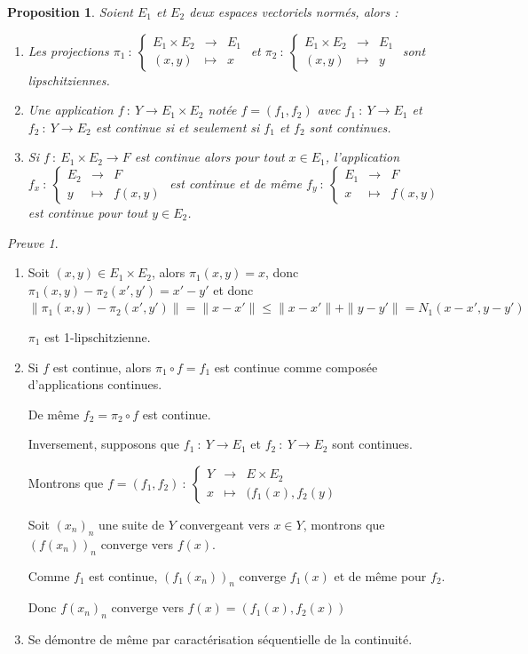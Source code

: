 \documentclass[]{article}
\newtheorem{myproposition}{Proposition}
\theoremstyle{remark}
\newtheorem{myproof}{Preuve}
\theoremstyle{definition}
\newcommand{\func}[5]{
#1 ~ : ~ \left\{ \begin{array}{lcl}
	#2 & \longrightarrow & #3 \\
	#4 & \longmapsto & #5
\end{array}
\right.
}
\newcommand{\funcshort}[3]{
#1 ~ : ~ #2 \longrightarrow #3
}
\begin{document}
\begin{myproposition}
	Soient $E_1$ et $E_2$ deux espaces vectoriels normés, alors :
	
	\begin{enumerate}
		\item Les projections $\func{\pi_1}{E_1 \times E_2}{E_1}{(x,y)}{x}$
		et $\func{\pi_2}{E_1 \times E_2}{E_1}{(x,y)}{y}$
		sont lipschitziennes.
		
		\item Une application $\funcshort{f}{Y}{E_1 \times E_2}$ notée $f=(f_1, f_2)$ avec $\funcshort{f_1}{Y}{E_1}$ et $\funcshort{f_2}{Y}{E_2}$ est continue si et seulement si $f_1$ et $f_2$ sont continues.
		
		\item Si $\funcshort{f}{E_1 \times E_2}{F}$ est continue alors pour tout $x \in E_1$, l'application $\func{f_x}{E_2}{F}{y}{f(x, y)}$ est continue et de même $\func{f_y}{E_1}{F}{x}{f(x, y)}$ est continue pour tout $y \in E_2$.
	\end{enumerate}
\end{myproposition}

\begin{myproof}
	\begin{enumerate}
		\item Soit $(x, y) \in E_1 \times E_2$, alors $\pi_1(x, y) = x$, donc $\pi_1(x,y) - \pi_2(x',y')=x'-y'$ et donc $\|\pi_1(x,y) - \pi_2(x',y')\| = \|x-x'\| \leqslant \|x-x'\| + \|y-y'\| = N_1(x-x', y-y')$
		
		$\pi_1$ est 1-lipschitzienne.
		
		\item Si $f$ est continue, alors $\pi_1 \circ f=f_1$ est continue comme composée d'applications continues.
		
		De même $f_2=\pi_2 \circ f$ est continue.
		
		Inversement, supposons que $\funcshort{f_1}{Y}{E_1}$ et $\funcshort{f_2}{Y}{E_2}$ sont continues.
		
		Montrons que $\func{f=(f_1, f_2)}{Y}{E \times E_2}{x}{(f_1(x), f_2(y)}$
		
		Soit $(x_n)_n$ une suite de $Y$ convergeant vers $x \in Y$, montrons que $(f(x_n))_n$ converge vers $f(x)$.
		
		Comme $f_1$ est continue, $(f_1(x_n))_n$ converge $f_1(x)$ et de même pour $f_2$.
		
		Donc $f(x_n)_n$ converge vers $f(x)=(f_1(x), f_2(x))$
		
		\item Se démontre de même par caractérisation séquentielle de la continuité.
	\end{enumerate}
\end{myproof}
\end{document}
